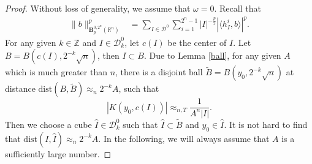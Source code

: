\documentclass[oneside,english,a4wide]{amsart}
\numberwithin{equation}{section}
\numberwithin{figure}{section}
\theoremstyle{plain}
\theoremstyle{plain}
\theoremstyle{definition}
\theoremstyle{plain}
\theoremstyle{remark}
\theoremstyle{definition}
\theoremstyle{remark}
\theoremstyle{definition}
\newcommand{\8}{\infty}
\begin{document}
\begin{proof}
Without loss of generality, we assume that $\omega=0$. Recall that
	\begin{equation*}
		\begin{aligned}
			\|b\|^p_{\pmb{B}_p^{0,2^n}(\mathbb{R}^n)}{}&=\sum_{I\in\mathcal{D}^0}\sum_{i=1}^{2^n-1}|I|^{-\frac{p}{2}}|\langle h_I^i,b\rangle|^p.
		\end{aligned}
	\end{equation*}
	For any given $k\in \mathbb{Z}$ and $I\in \mathcal{D}_k^0$, let $c(I)$ be the center of $I$. Let $B=B(c(I),2^{-k}\sqrt{n})$, then $I\subset B$. Due to Lemma \ref{ball}, for any given $A$ which is much greater than $n$, there is a disjoint ball $\tilde{B}=B(y_0,2^{-k}\sqrt{n})$ at distance $\mathrm{dist}(B,\tilde{B})\approx_n 2^{-k}A$, such that
	\begin{equation}\label{minus1}
		|K(y_0,c(I))|\approx_{n,T} \frac{1}{A^n|I|}.
	\end{equation}
	Then we choose a cube $\hat{I}\in \mathcal{D}^0_k$ such that $\hat{I}\subset \tilde{B}$ and $y_0\in \hat{I}$. It is not hard to find that $\mathrm{dist}(I,\hat{I})\approx_n 2^{-k}A$. In the following, we will always assume that $A$ is a sufficiently large number.
	

\end{proof}
\end{document}
